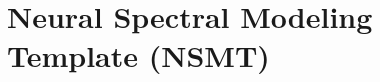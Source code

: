 \section[toc={Neural Spectral Modeling}]{Neural Spectral Modeling Template (NSMT)}

\begin{emptyslide}[toc={}]{}
\vspace{-1.44em}
\end{emptyslide}


